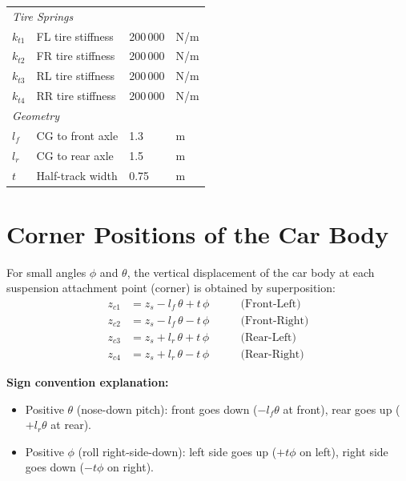 \documentclass[11pt]{article}
\begin{document}
\begin{table}[h]
\begin{tabular}{@{}llll@{}}
\midrule
\multicolumn{4}{l}{\textit{Tire Springs}} \\
$k_{t1}$ & FL tire stiffness               & 200\,000 & N/m \\
$k_{t2}$ & FR tire stiffness               & 200\,000 & N/m \\
$k_{t3}$ & RL tire stiffness               & 200\,000 & N/m \\
$k_{t4}$ & RR tire stiffness               & 200\,000 & N/m \\
\midrule
\multicolumn{4}{l}{\textit{Geometry}} \\
$l_f$    & CG to front axle                & 1.3    & m \\
$l_r$    & CG to rear axle                 & 1.5    & m \\
$t$      & Half-track width                & 0.75   & m \\
\bottomrule
\end{tabular}
\end{table}

\section{Corner Positions of the Car Body}

For small angles $\phi$ and $\theta$, the vertical displacement of the car body at each suspension attachment point (corner) is obtained by superposition:
\begin{align}
z_{c1} &= z_s - l_f\,\theta + t\,\phi  \qquad &\text{(Front-Left)}  \label{eq:zc1} \\
z_{c2} &= z_s - l_f\,\theta - t\,\phi  \qquad &\text{(Front-Right)} \label{eq:zc2} \\
z_{c3} &= z_s + l_r\,\theta + t\,\phi  \qquad &\text{(Rear-Left)}   \label{eq:zc3} \\
z_{c4} &= z_s + l_r\,\theta - t\,\phi  \qquad &\text{(Rear-Right)}  \label{eq:zc4}
\end{align}

\noindent\textbf{Sign convention explanation:}
\begin{itemize}[nosep]
  \item Positive $\theta$ (nose-down pitch): front goes down ($-l_f\theta$ at front), rear goes up ($+l_r\theta$ at rear).
  \item Positive $\phi$ (roll right-side-down): left side goes up ($+t\phi$ on left), right side goes down ($-t\phi$ on right).
\end{itemize}
\end{document}
